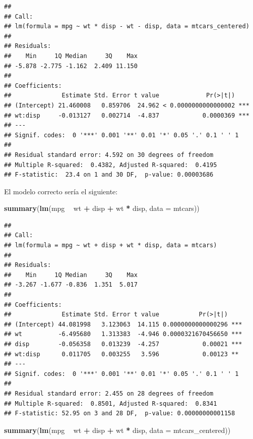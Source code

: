 \documentclass[
  12pt,
]{book}
\newenvironment{Shaded}{\begin{snugshade}}{\end{snugshade}}
\newcommand{\DataTypeTok}[1]{\textcolor[rgb]{0.13,0.29,0.53}{#1}}
\newcommand{\KeywordTok}[1]{\textcolor[rgb]{0.13,0.29,0.53}{\textbf{#1}}}
\newcommand{\NormalTok}[1]{#1}
\newcommand{\OperatorTok}[1]{\textcolor[rgb]{0.81,0.36,0.00}{\textbf{#1}}}
\newcommand{\StringTok}[1]{\textcolor[rgb]{0.31,0.60,0.02}{#1}}
\theoremstyle{definition}
\theoremstyle{definition}
\theoremstyle{definition}
\theoremstyle{remark}
\begin{document}
\begin{verbatim}
## 
## Call:
## lm(formula = mpg ~ wt * disp - wt - disp, data = mtcars_centered)
## 
## Residuals:
##    Min     1Q Median     3Q    Max 
## -5.878 -2.775 -1.162  2.409 11.150 
## 
## Coefficients:
##              Estimate Std. Error t value             Pr(>|t|)    
## (Intercept) 21.460008   0.859706  24.962 < 0.0000000000000002 ***
## wt:disp     -0.013127   0.002714  -4.837            0.0000369 ***
## ---
## Signif. codes:  0 '***' 0.001 '**' 0.01 '*' 0.05 '.' 0.1 ' ' 1
## 
## Residual standard error: 4.592 on 30 degrees of freedom
## Multiple R-squared:  0.4382, Adjusted R-squared:  0.4195 
## F-statistic:  23.4 on 1 and 30 DF,  p-value: 0.00003686
\end{verbatim}

El modelo correcto sería el siguiente:

\begin{Shaded}
\begin{Highlighting}[]
\KeywordTok{summary}\NormalTok{(}\KeywordTok{lm}\NormalTok{(mpg }\OperatorTok{~}\StringTok{ }\NormalTok{wt }\OperatorTok{+}\StringTok{ }\NormalTok{disp }\OperatorTok{+}\StringTok{ }\NormalTok{wt }\OperatorTok{*}\StringTok{ }\NormalTok{disp, }\DataTypeTok{data =}\NormalTok{ mtcars))}
\end{Highlighting}
\end{Shaded}

\begin{verbatim}
## 
## Call:
## lm(formula = mpg ~ wt + disp + wt * disp, data = mtcars)
## 
## Residuals:
##    Min     1Q Median     3Q    Max 
## -3.267 -1.677 -0.836  1.351  5.017 
## 
## Coefficients:
##              Estimate Std. Error t value           Pr(>|t|)    
## (Intercept) 44.081998   3.123063  14.115 0.0000000000000296 ***
## wt          -6.495680   1.313383  -4.946 0.0000321670456650 ***
## disp        -0.056358   0.013239  -4.257            0.00021 ***
## wt:disp      0.011705   0.003255   3.596            0.00123 ** 
## ---
## Signif. codes:  0 '***' 0.001 '**' 0.01 '*' 0.05 '.' 0.1 ' ' 1
## 
## Residual standard error: 2.455 on 28 degrees of freedom
## Multiple R-squared:  0.8501, Adjusted R-squared:  0.8341 
## F-statistic: 52.95 on 3 and 28 DF,  p-value: 0.00000000001158
\end{verbatim}

\begin{Shaded}
\begin{Highlighting}[]
\KeywordTok{summary}\NormalTok{(}\KeywordTok{lm}\NormalTok{(mpg }\OperatorTok{~}\StringTok{ }\NormalTok{wt }\OperatorTok{+}\StringTok{ }\NormalTok{disp }\OperatorTok{+}\StringTok{ }\NormalTok{wt }\OperatorTok{*}\StringTok{ }\NormalTok{disp, }\DataTypeTok{data =}\NormalTok{ mtcars_centered))}
\end{Highlighting}
\end{Shaded}
\end{document}
